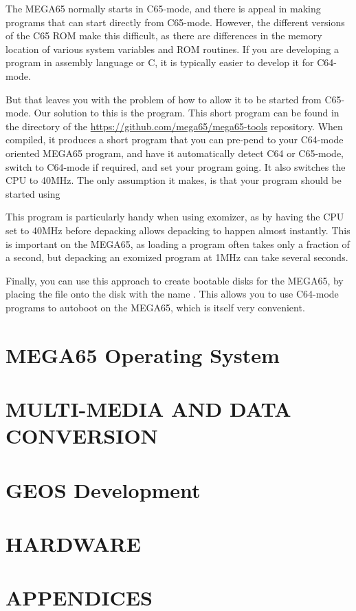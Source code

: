The MEGA65 normally starts in C65-mode, and there is appeal in making
programs that can start directly from C65-mode.  However, the
different versions of the C65 ROM make this difficult, as there are
differences in the memory location of various system variables and ROM
routines.  If you are developing a program in assembly language or
C, it is typically easier to develop it for C64-mode.

But that leaves
you with the problem of how to allow it to be started from C65-mode.
Our solution to this is the  program.  This
short program can be found in the  directory of
the \url{https://github.com/mega65/mega65-tools} repository.  When
compiled, it produces a short program that you can pre-pend to your
C64-mode oriented MEGA65 program, and have it automatically detect
C64 or C65-mode, switch to C64-mode if required, and set your
program going. It also switches the CPU to 40MHz.  The only
assumption it makes, is that your program should be started using

This program is particularly handy when using exomizer, as by having
the CPU set to 40MHz before depacking allows depacking to happen
almost instantly.  This is important on the MEGA65, as loading a
program often takes only a fraction of a second, but depacking an
exomized program at 1MHz can take several seconds.

Finally, you can use this approach to create bootable disks for the
MEGA65, by placing the file onto the disk with the
name .  This allows you to use C64-mode programs
to autoboot on the MEGA65, which is itself very convenient.

\part{MEGA65 Operating System}



{}

\part{MULTI-MEDIA AND DATA CONVERSION}

\part{GEOS Development}

\part{HARDWARE}



\part{APPENDICES}

\appendix
  
  
  
  


\nocite{*}



\printindex



